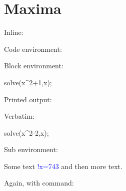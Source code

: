 \documentclass[11pt]{article}
\begin{document}
\section*{Maxima}

Inline:  

Code environment:

Block environment:
\begin{maximablock}
solve(x^2+1,x);
\end{maximablock}
Printed output:
\printpythontex

Verbatim:
\begin{maximaverbatim}
solve(x^2-2,x);
\end{maximaverbatim}

Sub environment:
\begin{maximasub}
Some text \textcolor{blue}{!{x=743}} and then more text.
\end{maximasub}

Again, with command:  
\end{document}
